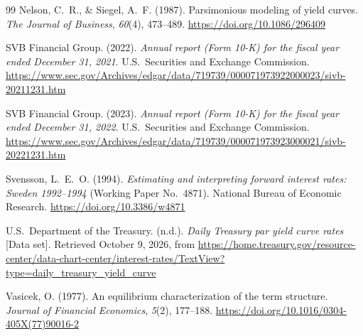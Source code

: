 \begin{thebibliography}{99}
Nelson, C.~R., \& Siegel, A.~F. (1987). Parsimonious modeling of yield curves.
\textit{The Journal of Business}, \textit{60}(4), 473--489.
\url{https://doi.org/10.1086/296409}

SVB Financial Group. (2022). \textit{Annual report (Form 10-K) for the fiscal year
ended December 31, 2021}. U.S.\ Securities and Exchange Commission.
\url{https://www.sec.gov/Archives/edgar/data/719739/000071973922000023/sivb-20211231.htm}

SVB Financial Group. (2023). \textit{Annual report (Form 10-K) for the fiscal year
ended December 31, 2022}. U.S.\ Securities and Exchange Commission.
\url{https://www.sec.gov/Archives/edgar/data/719739/000071973923000021/sivb-20221231.htm}

Svensson, L.~E.~O. (1994). \textit{Estimating and interpreting forward interest
rates: Sweden 1992--1994} (Working Paper No.\ 4871). National Bureau of Economic
Research. \url{https://doi.org/10.3386/w4871}

U.S.\ Department of the Treasury. (n.d.). \textit{Daily Treasury par yield curve
rates} [Data set]. Retrieved October 9, 2026, from
\url{https://home.treasury.gov/resource-center/data-chart-center/interest-rates/TextView?type=daily_treasury_yield_curve}

Vasicek, O. (1977). An equilibrium characterization of the term structure.
\textit{Journal of Financial Economics}, \textit{5}(2), 177--188.
\url{https://doi.org/10.1016/0304-405X(77)90016-2}

\end{thebibliography}
